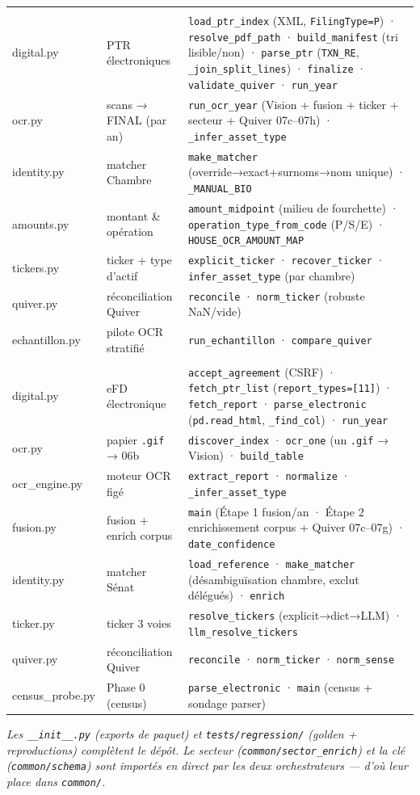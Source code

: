 \documentclass[11pt,a4paper]{article}
\newcommand{\co}[1]{\texttt{\small #1}}
\begin{document}
{\begin{longtable}{>{\ttfamily\footnotesize}p{2.4cm} p{4.0cm} p{8.8cm}}
\midrule
\multicolumn{3}{l}{\bfseries\color{houseC} house/ — orchestrateur Chambre (7)}\\
digital.py & PTR électroniques & \co{load_ptr_index} (XML, \co{FilingType=P}) · \co{resolve_pdf_path} · \co{build_manifest} (tri lisible/non) · \co{parse_ptr} (\co{TXN_RE}, \co{_join_split_lines}) · \co{finalize} · \co{validate_quiver} · \co{run_year} \\
ocr.py & scans → FINAL (par an) & \co{run_ocr_year} (Vision + fusion + ticker + secteur + Quiver 07c--07h) · \co{_infer_asset_type} \\
identity.py & matcher Chambre & \co{make_matcher} (override→exact+surnoms→nom unique) · \co{_MANUAL_BIO} \\
amounts.py & montant \& opération & \co{amount_midpoint} (milieu de fourchette) · \co{operation_type_from_code} (P/S/E) · \co{HOUSE_OCR_AMOUNT_MAP} \\
tickers.py & ticker + type d'actif & \co{explicit_ticker} · \co{recover_ticker} · \co{infer_asset_type} (par chambre) \\
quiver.py & réconciliation Quiver & \co{reconcile} · \co{norm_ticker} (robuste NaN/vide) \\
echantillon.py & pilote OCR stratifié & \co{run_echantillon} · \co{compare_quiver} \\
\midrule
\multicolumn{3}{l}{\bfseries\color{senateC} senate/ — orchestrateur Sénat (8)}\\
digital.py & eFD électronique & \co{accept_agreement} (CSRF) · \co{fetch_ptr_list} (\co{report_types=[11]}) · \co{fetch_report} · \co{parse_electronic} (\co{pd.read_html}, \co{_find_col}) · \co{run_year} \\
ocr.py & papier \co{.gif} → 06b & \co{discover_index} · \co{ocr_one} (un \co{.gif} → Vision) · \co{build_table} \\
ocr_engine.py & moteur OCR figé & \co{extract_report} · \co{normalize} · \co{_infer_asset_type} \\
fusion.py & fusion + enrich corpus & \co{main} (Étape 1 fusion/an · Étape 2 enrichissement corpus + Quiver 07c--07g) · \co{date_confidence} \\
identity.py & matcher Sénat & \co{load_reference} · \co{make_matcher} (désambiguïsation chambre, exclut délégués) · \co{enrich} \\
ticker.py & ticker 3 voies & \co{resolve_tickers} (explicit→dict→LLM) · \co{llm_resolve_tickers} \\
quiver.py & réconciliation Quiver & \co{reconcile} · \co{norm_ticker} · \co{norm_sense} \\
census_probe.py & Phase 0 (census) & \co{parse_electronic} · \co{main} (census + sondage parser) \\
\bottomrule
\end{longtable}}
\textit{Les \co{__init__.py} (exports de paquet) et \co{tests/regression/} (golden + reproductions)
complètent le dépôt. Le secteur (\co{common/sector_enrich}) et la clé (\co{common/schema}) sont importés
\emph{en direct} par les deux orchestrateurs — d'où leur place dans \co{common/}.}
\end{document}
